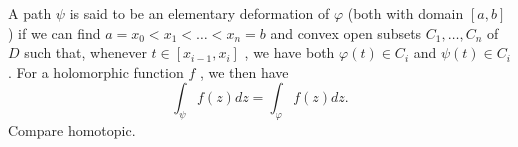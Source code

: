 A path  $  \psi  $ 
is said to be an elementary deformation of  $  \varphi  $ 
(both with domain  $ [a,b] $ )
if we can find  $ a=x_0<x_1< \ldots<x_n=b $  and convex open subsets
 $ C_1, \ldots,C_n $  of  $ D $  such that, whenever  $ t \in[x_{i-1},x_i] $ , we
have both  $  \varphi (t) \in C_i $  and  $  \psi(t) \in C_i $ . For a
holomorphic function  $ f $ , we then have
 \[  \int_ \psi f(z) dz =  \int_ \varphi f(z) dz. \] Compare
homotopic.


